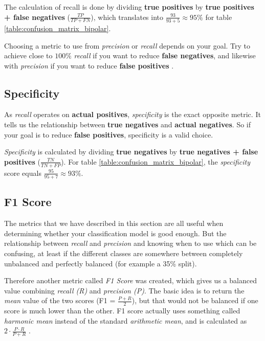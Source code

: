 The calculation of recall is done by dividing \textbf{true positives} by \textbf{true positives + false negatives} ($ \frac{TP}{TP+FN} $), 
which translates into $ \frac{93}{93+5} \approx 95\% $ for table \ref{table:confusion_matrix_bipolar}.

Choosing a metric to use from \textit{precision} or \textit{recall} depends on your goal. Try to achieve close to $ 100\% $ \textit{recall} 
if you want to reduce \textbf{false negatives}, and likewise with \textit{precision} if you want to reduce \textbf{false positives} \cite{ml_metrics}.

\subsection{Specificity}

As \textit{recall} operates on \textbf{actual positives}, \textit{specificity} is the exact opposite metric. It tells us the relationship between
\textbf{true negatives} and \textbf{actual negatives}. So if your goal is to reduce \textbf{false positives}, specificity is a valid choice.

\textit{Specificity} is calculated by dividing \textbf{true negatives} by \textbf{true negatives + false positives} ($ \frac{TN}{TN+FP} $). 
For table \ref{table:confusion_matrix_bipolar}, the \textit{specificity} score equals $ \frac{95}{95+7} \approx 93\% $.

\subsection{F1 Score}

The metrics that we have described in this section are all useful when determining whether your classification model is good enough. 
But the relationship between \textit{recall} and \textit{precision} and knowing when to use which can be confusing, at least if the different classes
are somewhere between completely unbalanced and perfectly balanced (for example a 35\% split). 

Therefore another metric called \textit{F1 Score} was created, which gives us a balanced value combining \textit{recall (R)} and \textit{precision (P)}.
The basic idea is to return the \textit{mean} value of the two scores (F1 = $ \frac{P + R}{2} $), but that would not be balanced if one score is
much lower than the other. F1 score actually uses something called \textit{harmonic mean} instead of the standard \textit{arithmetic mean}, 
and is calculated as $ 2 \cdot \frac{P \cdot R}{P + R} $ \cite{ml_metrics}. 

